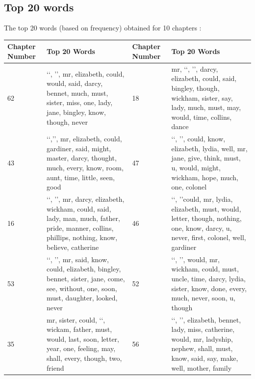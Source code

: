 \documentclass{article}
\begin{document}
\subsection{Top 20 words}
\begin{flushleft}
	The top 20 words (based on frequency) obtained for 10 chapters :
	\begin{center}
		\begin{tabular}{|p{}|p{}||p{}|p{}|}
			\hline
			Chapter Number & Top 20 Words & Chapter Number & Top 20 Words \\
			\hline
			\hline
			62 & \lq\lq, \rq\rq, mr, elizabeth, could, would, said, darcy, bennet, much, must, sister, miss, one, lady, jane, bingley, know, though, never &
			18 & mr, \lq\lq, \rq\rq, darcy, elizabeth, could, said, bingley, though, wickham, sister, say, lady, much, must, may, would, time, collins, dance\\
			\hline
			43 & \lq\lq,\rq\rq, mr, elizabeth, could, gardiner, said, might, master, darcy, thought, much, every, know, room, aunt, time, little, seen, good & 
			47 &  \lq\lq, \rq\rq, could, know, elizabeth, lydia, well, mr, jane, give, think, must, u, would, might, wickham, hope, much, one, colonel  \\
			\hline
			16 & \lq\lq, \rq\rq, mr, darcy, elizabeth, wickham, could, said, lady, man, much, father, pride, manner, collins, phillips, nothing, know, believe, catherine &
			46 & \lq\lq, \rq\rq could, mr, lydia, elizabeth, must, would, letter, though, nothing, one, know, darcy, u, never, first, colonel, well, gardiner\\
			\hline
			53 & \lq\lq, \rq\rq, mr, said, know, could, elizabeth, bingley, bennet, sister, jane, come, see, without, one, soon, must, daughter, looked, never &
			52 & \lq\lq, \rq\rq, would, mr, wickham, could, must, uncle, time, darcy, lydia, sister, know, done, every, much, never, soon, u, though  \\
			\hline
			35 & mr, sister, could, \lq\lq, wickam, father, must, would, last, soon, letter, year, one, feeling, may, shall, every, though, two, friend   &
			56 & \lq\lq, \rq\rq, elizabeth, bennet, lady, miss, catherine, would, mr, ladyship, nephew, shall, must, know, said, say, make, well, mother, family \\
			\hline
		\end{tabular}
	\end{center}
\end{flushleft}
\newpage
\end{document}
